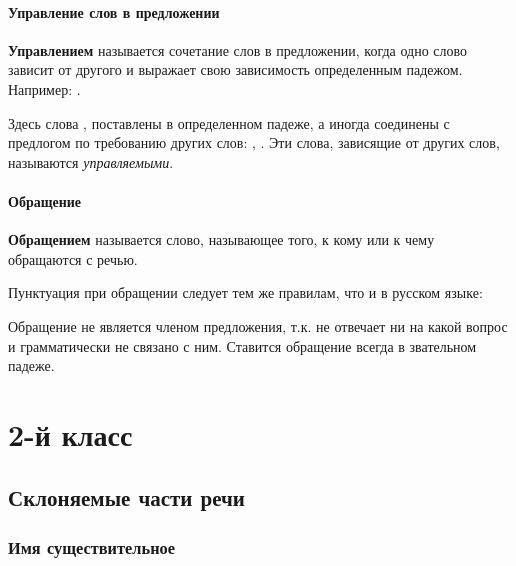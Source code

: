 \documentclass[11pt,a4paper,oneside]{memoir}
\begin{document}
    \bigskip{}

                \subsubsection{Управление слов в предложении}

    \textbf{Управлением} называется сочетание слов в предложении, когда одно слово зависит от другого и выражает свою зависимость определенным падежом. Например: {}.
    
    Здесь слова {\slv{}}, {\slv{}} поставлены в определенном падеже, а иногда соединены с предлогом по требованию других слов: {\slv{}}, {\slv{}}. Эти слова, зависящие от других слов, называются \emph{управляемыми}.

                \subsubsection{Обращение}

    \textbf{Обращением} называется слово, называющее того, к кому или к чему обращаются с речью.
    
    Пунктуация при обращении следует тем же правилам, что и в русском языке:
    
    \bigskip{}

    Обращение не является членом предложения, т.к. не отвечает ни на какой вопрос и грамматически не связано с ним. Ставится обращение всегда в звательном падеже.

    \chapter*{2-й класс}
    \label{ch:secondgrade}
    \setcounter{section}{0}
    \setcounter{subsubsection}{0}
        \section{Склоняемые части речи}
            \subsection{Имя существительное}
\end{document}

